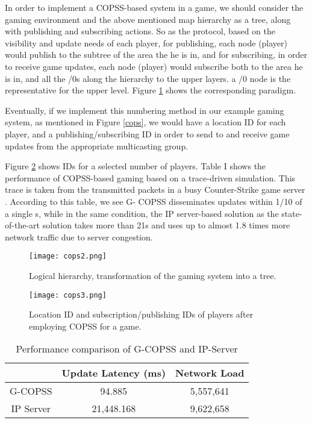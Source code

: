 \documentclass[conference]{IEEEtran}
\begin{document}
In  order  to  implement  a  COPSS-based  system  in  a game, we should consider the gaming environment and the above mentioned map hierarchy as a tree, along with publishing and subscribing actions. So as the protocol, based on the visibility and update needs of each player, for publishing, each node (player) would publish to the subtree of the area the he is in, and for subscribing, in order to receive game updates, each node (player) would subscribe both to the area he is in, and all the /0s along the hierarchy to the upper layers. a /0 node is the representative for the upper level. Figure \ref{cops2} shows the corresponding paradigm.

Eventually, if we implement this numbering method in our example gaming system, as mentioned in Figure \ref{cops}, we would have a location ID for each player, and a publishing/subscribing ID in order to send to and receive game updates from the appropriate multicasting group.

Figure \ref{cops3} shows IDs for a selected number of players. Table I shows the performance of COPSS-based gaming based on a trace-driven simulation. This trace is taken from the transmitted packets in a busy Counter-Strike game server \cite{r29}. According to this table, we see G- COPSS disseminates updates within 1/10 of a single s, while in the same condition, the IP server-based solution as the state-of-the-art solution takes more than 21s and uses up to almost 1.8 times more network traffic due to server congestion.

\begin{figure}[!t]
\caption{Logical hierarchy, transformation of the gaming system into a tree.}
\centering
\texttt{[image: cops2.png]}
\label{cops2}
\end{figure}

\begin{figure}[!t]
\caption{Location ID and subscription/publishing IDs of players after employing COPSS for a game.}
\centering
\texttt{[image: cops3.png]}
\label{cops3}
\end{figure}

\begin{table}[!t]
\caption{Performance comparison of G-COPSS and IP-Server}
\centering
\begin{tabular}{|c|c|c|}
\hline 
 & Update Latency (ms) & Network Load \\ 
\hline 
G-COPSS & 94.885 & 5,557,641 \\ 
\hline 
IP Server & 21,448.168 & 9,622,658 \\ 
\hline 
\end{tabular} 
\end{table}
\end{document}
